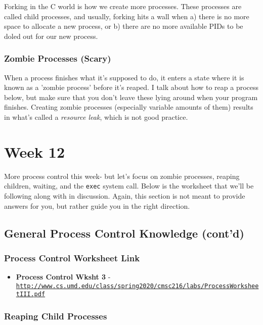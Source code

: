 \documentclass[english, 10pt]{article}
\begin{document}
Forking in the C world is how we create more processes. These processes are called child processes, and usually, forking hits a wall when a) there is no more space to allocate a new process, or b) there are no more available PIDs to be doled out for our new process.

\subsubsection{Zombie Processes (Scary)}

When a process finishes what it's supposed to do, it enters a state where it is known as a 'zombie process' before it's reaped. I talk about how to reap a process below, but make sure that you don't leave these lying around when your program finishes. Creating zombie processes (especially variable amounts of them) results in what's called a \textit{resource leak}, which is not good practice.

\section{Week 12}

More process control this week- but let's focus on zombie processes, reaping children, waiting, and the \texttt{exec} system call. Below is the worksheet that we'll be following along with in discussion. Again, this section is not meant to provide answers for you, but rather guide you in the right direction.

\subsection{General Process Control Knowledge (cont'd)}

\subsubsection{Process Control Worksheet Link}

\begin{itemize}
	\item \textbf{Process Control Wksht 3} - \texttt{\href{http://www.cs.umd.edu/class/spring2020/cmsc216/labs/ProcessWorksheetIII.pdf}{http://www.cs.umd.edu/class/spring2020/cmsc216/labs/ProcessWorksheetIII.pdf}}
\end{itemize}

\subsubsection{Reaping Child Processes}
\end{document}
